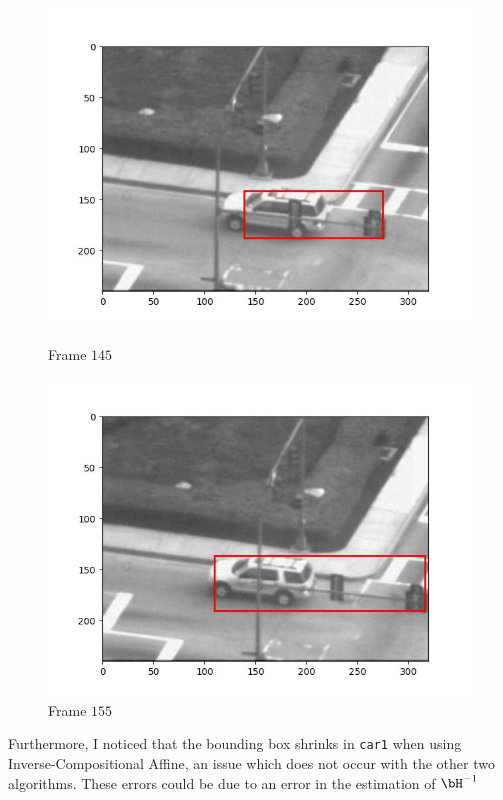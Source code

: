 \begin{figure}[H]
\begin{minipage}{.49\textwidth}
    \includegraphics[width=\textwidth]{./figures/ic_affine/car2/frame000145.jpg}
    \caption{Frame $145$}
  \end{minipage}
  \begin{minipage}{.49\textwidth}
    \centering
    \includegraphics[width=\textwidth]{./figures/ic_affine/car2/frame000155.jpg}
    \caption{Frame $155$}
  \end{minipage}
\end{figure}

Furthermore, I noticed that the bounding box shrinks in \verb|car1| when using
Inverse-Compositional Affine, an issue which does not occur with the other two algorithms.
These errors could be due to an error in the estimation of $\bH^{-1}$
